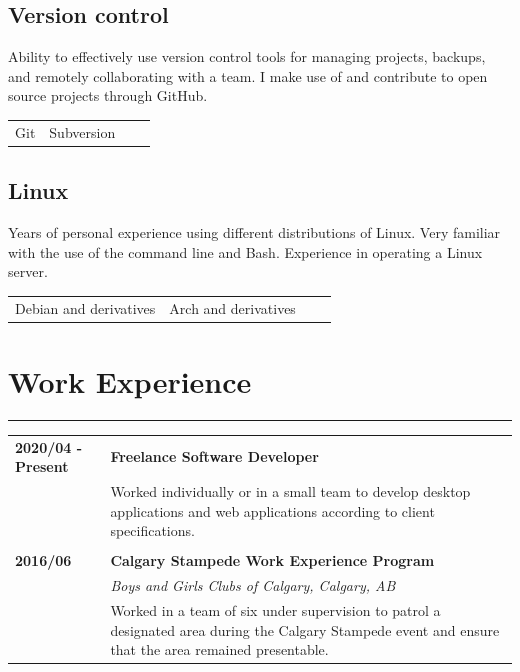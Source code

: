 \documentclass[letterpaper]{article}
\newcommand{\horizontalLine}{%
    \rule{\textwidth}{0.2pt}
    \vspace{1ex}
}
\begin{document}
        \subsection*{Version control}
        Ability to effectively use version control tools for managing projects, backups, and remotely collaborating with a team.
        I make use of and contribute to open source projects through GitHub.

        \begin{center}
        \begin{tabular}{p{} p{} p{} p{}}
            Git & Subversion &&\\
        \end{tabular}
        \end{center}

        \subsection*{Linux}

        Years of personal experience using different distributions of Linux.
        Very familiar with the use of the command line and Bash.
        Experience in operating a Linux server.

        \begin{center}
        \begin{tabular}{p{} p{} p{} p{}}
            Debian and derivatives & Arch and derivatives &&\\
        \end{tabular}
        \end{center}

    \section*{Work Experience}

        \horizontalLine

        \begin{tabular}{p{} p{}} 
            \textbf{2020/04 - Present} & \large\textbf{Freelance Software Developer} \\
            & Worked individually or in a small team to develop desktop applications and web applications according to client specifications. \\
            \\
            \textbf{2016/06} & \large\textbf{Calgary Stampede Work Experience Program} \\
            & \emph{Boys and Girls Clubs of Calgary, Calgary, AB} \\
            & Worked in a team of six under supervision to patrol a designated area during the Calgary Stampede event and ensure that the area remained presentable. \\
        \end{tabular}
\end{document}
